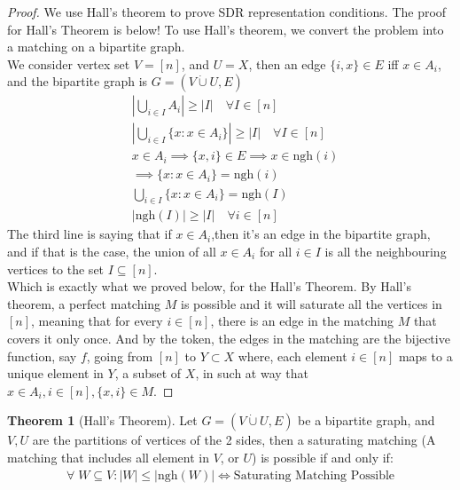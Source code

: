 \documentclass[]{article}
\theoremstyle{definition}
\newtheorem{theorem}{Theorem}       %
\begin{document}
    \begin{proof}
        We use Hall's theorem to prove SDR representation conditions. The proof for Hall's Theorem is below! To use Hall's theorem, we convert the problem into a matching on a bipartite graph. 
        \\[1.1em]
        We consider vertex set $V = [n]$, and $U = X$, then an edge $\{i, x\} \in E$ iff $x\in A_i$, and the bipartite graph is $G = (V\dot\cup U, E)$
        \begin{align}
            & \left|
                \bigcup_{i\in I} A_i
            \right| \ge |I| 
            \quad
            \forall I \in [n]
            \\
            & \left|
                \bigcup_{i\in I} \{x: x\in A_i\}
            \right| \ge |I| 
            \quad
            \forall I \in [n]
            \\
            & x\in A_i \implies \{x, i\}\in E \implies x \in \text{ngh}(i)
            \\
            & \implies \{x: x\in A_i\} = \text{ngh}(i)
            \\
            & \bigcup_{i \in I} \{x: x\in A_i\} = \text{ngh}(I)
            \\
            & |\text{ngh}(I)|\ge |I|\quad \forall i \in [n]
        \end{align}
        The third line is saying that if $x\in A_i$,then it's an edge in the bipartite graph, and if that is the case, the union of all $x\in A_i$ for all $i\in I$ is all the neighbouring vertices to the set $I\subseteq [n]$. 
        \\[1.1em]
        Which is exactly what we proved below, for the Hall's Theorem. By Hall's theorem, a perfect matching $M$ is possible and it will saturate all the vertices in $[n]$, meaning that for every $i\in [n]$, there is an edge in the matching $M$ that covers it only once. And by the token, the edges in the matching are the bijective function, say $f$, going from $[n]$ to $Y\subset X$ where, each element $i\in [n]$ maps to a unique element in $Y$, a subset of $X$, in such at way that $x\in A_i, i\in [n], \{x, i\}\in M$. 
    \end{proof}
    \begin{theorem}[Hall's Theorem]\label{theorem:Hall}
        Let $G = (V\dot{\cup} U, E)$ be a bipartite graph, and $V, U$ are the partitions of vertices of the 2 sides, then a saturating matching (A matching that includes all element in $V$, or $U$) is possible if and only if: 
        \begin{align}
            \forall\; W \subseteq V: 
            |W| \le |\text{ngh}(W)| \iff 
            \text{Saturating Matching Possible}
        \end{align}
    \end{theorem}
\end{document}
